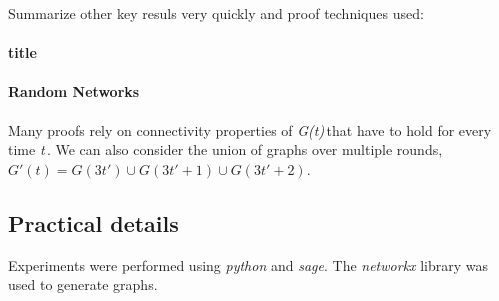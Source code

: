 \documentclass{article} %
\def\graph{\textit{G(t)}\,}
\def\graphtime{\textit{t}\,}
\begin{document}
Summarize other key resuls very quickly and proof techniques used:
\paragraph{title}
\paragraph{Random Networks}
Many proofs rely on connectivity properties of \graph that have to hold for every time \graphtime. We can also consider the union of graphs over multiple rounds, $G'(t) = G(3t') \cup G(3t'+1) \cup G(3t'+2)$.


\subsection{Practical details}
Experiments were performed using \textit{python} and \textit{sage}. The \textit{networkx} library was used to generate graphs.
\end{document}
